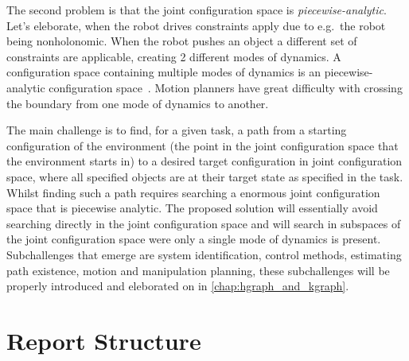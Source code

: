 The second problem is that the joint configuration space is \textit{piecewise-analytic}. Let's eleborate, when the robot drives constraints apply due to e.g.~the robot being nonholonomic. When the robot pushes an object a different set of constraints are applicable, creating 2 different modes of dynamics. A configuration space containing multiple modes of dynamics is an piecewise-analytic configuration space~\cite{vega-brown_asymptotically_2020}. Motion planners have great difficulty with crossing the boundary from one mode of dynamics to another.\bs

The main challenge is to find, for a given task, a path from a starting configuration of the environment (the point in the joint configuration space that the environment starts in) to a desired target configuration in joint configuration space, where all specified objects are at their target state as specified in the task. Whilst finding such a path requires searching a enormous joint configuration space that is piecewise analytic. The proposed solution will essentially avoid searching directly in the joint configuration space and will search in subspaces of the joint configuration space were only a single mode of dynamics is present. Subchallenges that emerge are system identification, control methods, estimating path existence, motion and manipulation planning, these subchallenges will be properly introduced and eleborated on in \cref{chap:hgraph_and_kgraph}.\bs

\section{Report Structure}%
\label{sec:report_structure}


